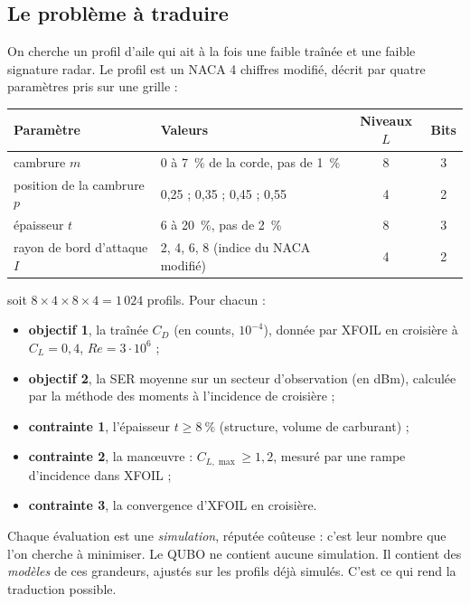 \subsection{Le problème à traduire}
On cherche un profil d'aile qui ait à la fois une faible traînée et une faible signature radar. Le profil est un NACA 4 chiffres modifié, décrit par quatre paramètres pris sur une grille :
\begin{center}
\renewcommand{\arraystretch}{1.2}
\begin{tabular}{llcc}
\toprule
Paramètre & Valeurs & Niveaux $L$ & Bits \\
\midrule
cambrure $m$ & 0 à 7~\% de la corde, pas de 1~\% & 8 & 3 \\
position de la cambrure $p$ & 0,25 ; 0,35 ; 0,45 ; 0,55 & 4 & 2 \\
épaisseur $t$ & 6 à 20~\%, pas de 2~\% & 8 & 3 \\
rayon de bord d'attaque $I$ & 2, 4, 6, 8 (indice du NACA modifié) & 4 & 2 \\
\bottomrule
\end{tabular}
\end{center}
soit $8\times4\times8\times4=1\,024$ profils. Pour chacun :
\begin{itemize}
\item \textbf{objectif 1}, la traînée $C_D$ (en counts, $10^{-4}$), donnée par XFOIL en croisière à $C_L=0{,}4$, $Re=3\cdot10^6$ ;
\item \textbf{objectif 2}, la SER moyenne sur un secteur d'observation (en dBm), calculée par la méthode des moments à l'incidence de croisière ;
\item \textbf{contrainte 1}, l'épaisseur $t\ge8~\%$ (structure, volume de carburant) ;
\item \textbf{contrainte 2}, la manœuvre : $C_{L,\max}\ge1{,}2$, mesuré par une rampe d'incidence dans XFOIL ;
\item \textbf{contrainte 3}, la convergence d'XFOIL en croisière.
\end{itemize}
Chaque évaluation est une \emph{simulation}, réputée coûteuse : c'est leur nombre que l'on cherche à minimiser. Le QUBO ne contient aucune simulation. Il contient des \emph{modèles} de ces grandeurs, ajustés sur les profils déjà simulés. C'est ce qui rend la traduction possible.

